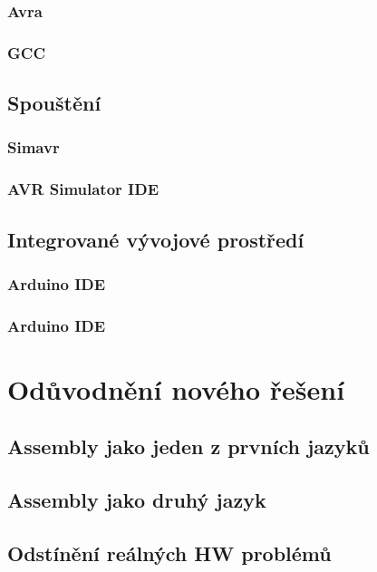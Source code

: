 \subsubsection{Avra}

\subsubsection{GCC}

\subsection{Spouštění}

\subsubsection{Simavr}

\subsubsection{AVR Simulator IDE}

\subsection{Integrované vývojové prostředí}

\subsubsection{Arduino IDE}

\subsubsection{Arduino IDE}

\section{Odůvodnění nového řešení}

\blind[1]

\subsection{Assembly jako jeden z prvních jazyků}

\blind[1]

\subsection{Assembly jako druhý jazyk}

\blind[2]

\subsection{Odstínění reálných HW problémů}

\blind[1]